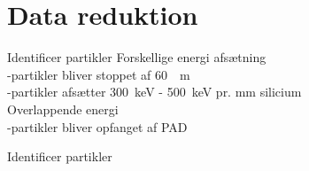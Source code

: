 \section{Data reduktion}

\begin{frame}{Identificer partikler}
	Forskellige energi afsætning\\
	\al-partikler bliver stoppet af \SI{60}{\mu m}\\
	\be-partikler afsætter \SI{300}{keV} - \SI{500}{keV} pr. mm silicium\\
	Overlappende energi\\
	\be-partikler bliver opfanget af PAD
\end{frame}

\begin{frame}{Identificer partikler}
	
\end{frame}
